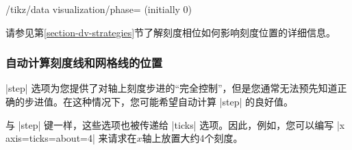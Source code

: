 \begin{key}{/tikz/data visualization/phase= (initially 0)} %

    请参见第\ref{section-dv-strategies}节了解刻度相位如何影响刻度位置的详细信息。
\end{key}


\subsubsection{自动计算刻度线和网格线的位置}


|step| 选项为您提供了对轴上刻度步进的``完全控制''，但是您通常无法预先知道正确的步进值。在这种情况下，您可能希望自动计算 |step| 的良好值。


与 |step| 键一样，这些选项也被传递给 |ticks| 选项。因此，例如，您可以编写 |x axis={ticks={about=4}}| 来请求在$x$轴上放置大约4个刻度。

